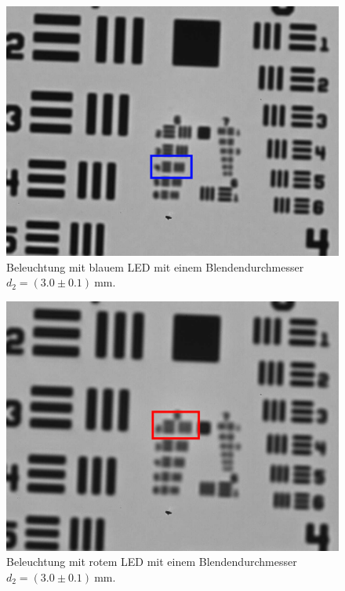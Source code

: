 \documentclass{article}
\begin{document}
\begin{minipage}[t]{.45\textwidth}
\begin{figure}[H]
\includegraphics[scale=0.5]{jw/B_B3_mark.jpg}
\caption{Beleuchtung mit blauem LED mit einem Blendendurchmesser $d_2=(3.0\pm0.1)~$mm.}
\label{fig:bbild_3_blau_jw}
\end{figure}
\end{minipage}
\hfill
\noindent
\begin{minipage}[t]{.45\textwidth}
\begin{figure}[H]
\includegraphics[scale=0.5]{jw/R_B3_mark.jpg}
\caption{Beleuchtung mit rotem LED mit einem Blendendurchmesser $d_2=(3.0\pm0.1)~$mm.}
\label{fig:bbild_3_rot_jw}
\end{figure}
\end{minipage}
\end{document}
